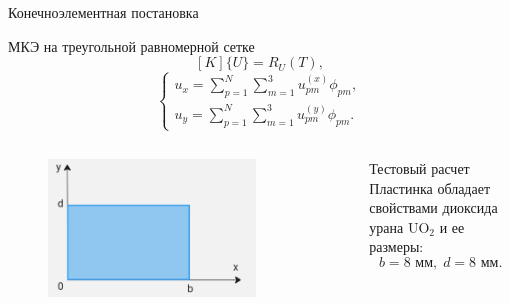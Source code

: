 \documentclass{beamer}
\begin{document}
\begin{frame}{Конечноэлементная постановка}
	\begin{block}{МКЭ на треугольной равномерной сетке}
	\[[K]\{U\}=R_U(T),\]
	\begin{equation*}
		\begin{cases}
			u_x=\sum\limits_{p=1}^N\sum\limits_{m=1}^3 u_{pm}^{(x)}\phi_{pm},\\
			u_y=\sum\limits_{p=1}^N\sum\limits_{m=1}^3 u_{pm}^{(y)}\phi_{pm}.
		\end{cases}
	\end{equation*}
	\end{block}
\begin{columns}
	\centering
	\begin{figure}[H]
	\centering
	\includegraphics[width=0.8\textwidth]{p1}
\end{figure}
	\centering
\begin{block}{Тестовый расчет}
Пластинка обладает свойствами диоксида урана UO$_2$ и ее размеры:
\[
	b = 8 \text{ мм},\;d = 8 \text{ мм}.
\]
\end{block}
\end{columns}
\end{frame}
\end{document}
